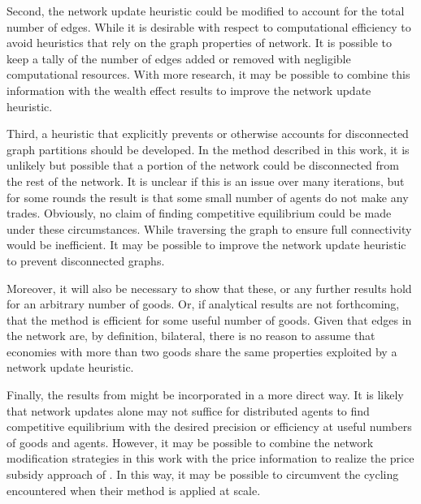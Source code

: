 \documentclass[smallextended]{svjour3}
\begin{document}
Second, the network update heuristic could be modified to account for the total
number of edges.
While it is desirable with respect to computational efficiency to avoid heuristics
that rely on the graph properties of network.
It is possible to keep a tally of the number of edges added or removed with
negligible computational resources.
With more research, it may be possible to combine this information with the
wealth effect results to improve the network update heuristic.

Third, a heuristic that explicitly prevents or otherwise accounts for
disconnected graph partitions should be developed. In the method described in
this work, it is unlikely but possible that a portion of the network could be
disconnected from the rest of the network. It is unclear if this is an issue
over many iterations, but for some rounds the result is that some small number
of agents do not make any trades. Obviously, no claim of finding competitive equilibrium
could be made under these circumstances. While traversing the graph to ensure
full connectivity would be inefficient. It may be possible to improve the
network update heuristic to prevent disconnected graphs.

Moreover, it will also be necessary to show that these, or any further results hold for an arbitrary number of goods.
Or, if analytical results are not forthcoming, that the method is
efficient for some useful number of goods.
Given that edges in the network are, by definition, bilateral, there is no reason to assume that economies with more than two goods share the same properties exploited by a network update
heuristic.

Finally, the results from \cite{sunder2002simple} might be incorporated in a
more direct way. It is likely that network updates alone may not suffice for
distributed agents to find competitive equilibrium with the desired precision or
efficiency at useful numbers of goods and agents. However, it may be possible to
combine the network modification strategies in this work with the price
information to realize the price subsidy approach of \cite{sunder2002simple}.
In this way, it may be possible to circumvent the cycling encountered when their
method is applied at scale.



\end{document}
